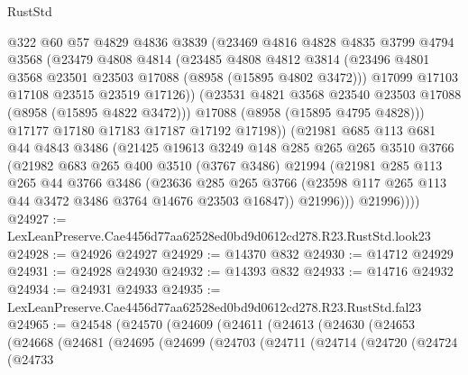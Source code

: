 \begin{lexlean}{RustStd}
\begin{coremodule}
              @322
              @60
              @57
              @4829
              @4836
              @3839
              (@23469
                @4816
                @4828
                @4835
                @3799
                @4794
                @3568
                (@23479
                  @4808
                  @4814
                  (@23485
                    @4808
                    @4812
                    @3814
                    (@23496 @4801 @3568 @23501 @23503 @17088 (@8958 (@15895 @4802 @3472)))
                    @17099
                    @17103
                    @17108
                    @23515
                    @23519
                    @17126))
                (@23531 @4821 @3568 @23540 @23503 @17088 (@8958 (@15895 @4822 @3472)))
                @17088
                (@8958 (@15895 @4795 @4828)))
              @17177
              @17180
              @17183
              @17187
              @17192
              @17198))
          (@21981
            @685
            @113
            @681
            @44
            @4843
            @3486
            (@21425
              @19613
              @3249
              @148
              @285
              @265
              @265
              @3510
              @3766
              (@21982
                @683
                @265
                @400
                @3510
                (@3767 @3486)
                @21994
                (@21981
                  @285
                  @113
                  @265
                  @44
                  @3766
                  @3486
                  (@23636
                    @285
                    @265
                    @3766
                    (@23598 @117 @265 @113 @44 @3472 @3486 @3764 @14676 @23503 @16847))
                  @21996)))
            @21996))))
@24927 := LexLeanPreserve.Cae4456d77aa62528ed0bd9d0612cd278.R23.RustStd.look23
@24928 := @24926 @24927
@24929 := @14370 @832
@24930 := @14712 @24929
@24931 := @24928 @24930
@24932 := @14393 @832
@24933 := @14716 @24932
@24934 := @24931 @24933
@24935 := LexLeanPreserve.Cae4456d77aa62528ed0bd9d0612cd278.R23.RustStd.fal23
@24965 := @24548
    (@24570
      (@24609
        (@24611
          (@24613
            (@24630
              (@24653
                (@24668
                  (@24681
                    (@24695
                      (@24699
                        (@24703
                          (@24711
                            (@24714
                              (@24720
                                (@24724
                                  (@24733

\end{coremodule}
\end{lexlean}
